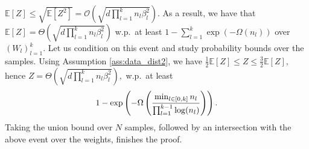 \documentclass[11pt]{article}
\newcommand{\E}{\mathbb{E}}
\newcommand{\bigO}[1]{\mathcal{O}\left(#1\right)}
\newcommand{\bigOmg}[1]{\Omega\left(#1\right)}
\newcommand{\bigTheta}[1]{\Theta\left(#1\right)}
\newcommand{\bigexp}[1]{\exp\left(#1\right)}
\def\min{\mathop{\rm min}\nolimits}
\begin{document}
	$\E[Z]\leq\sqrt{\E[Z^2]}=\bigO{\sqrt{d\prod_{l=1}^{k}n_l\beta_l^2}} .$
    As a result, we have that $\E[Z]=\bigTheta{\sqrt{d\prod_{l=1}^{k}n_l\beta_l^2}}$ w.p.\ at least $1 - \sum_{l=1}^{k}\exp(-\bigOmg{n_l})$ over $(W_l)_{l=1}^{k}.$
    Let us condition on this event and study probability bounds over the samples.
    Using Assumption \ref{ass:data_dist2},
    we have $\frac{1}{2}\E[Z]\leq Z\leq\frac{3}{2}\E[Z],$ hence $Z=\bigTheta{\sqrt{d\prod_{l=1}^{k}n_l\beta_l^2}},$
    w.p.\ at least
    \begin{align*}
	1-\bigexp{ -\bigOmg{ \frac{\min_{l\in[0,k]} n_l}{\prod_{l=1}^{k-1}\log(n_l)} } } .
    \end{align*}
    Taking the union bound over $N$ samples, followed by an intersection with the above event over the weights, finishes the proof.
\end{document}
